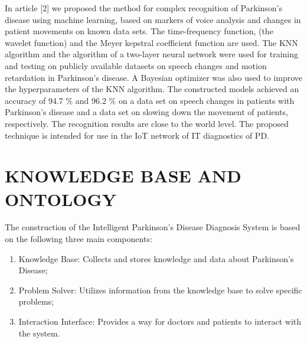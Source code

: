 \documentclass[10pt,two column]{article}
\begin{document}
In article [2] we proposed the method for complex
recognition of Parkinson’s disease using machine learning, based on markers of voice analysis and changes in patient movements on known data sets. The time-frequency
function, (the wavelet function) and the Meyer kepstral
coefficient function are used. The KNN algorithm and
the algorithm of a two-layer neural network were used
for training and testing on publicly available datasets on
speech changes and motion retardation in Parkinson’s disease. A Bayesian optimizer was also used to improve the
hyperparameters of the KNN algorithm. The constructed
models achieved an accuracy of 94.7 \% and 96.2 \% on a
data set on speech changes in patients with Parkinson’s
disease and a data set on slowing down the movement of
patients, respectively. The recognition results are close to
the world level. The proposed technique is intended for
use in the IoT network of IT diagnostics of PD.

\section{\textbf{KNOWLEDGE BASE AND ONTOLOGY}}
The construction of the Intelligent Parkinson’s Disease
Diagnosis System is based on the following three main
components:
\begin{enumerate}[label=\arabic*)]
    \item Knowledge Base: Collects and stores knowledge and
data about Parkinson’s Disease;
    \item Problem Solver: Utilizes information from the
knowledge base to solve specific problems;
    \item Interaction Interface: Provides a way for doctors and
patients to interact with the system.
\end{enumerate}
\end{document}
